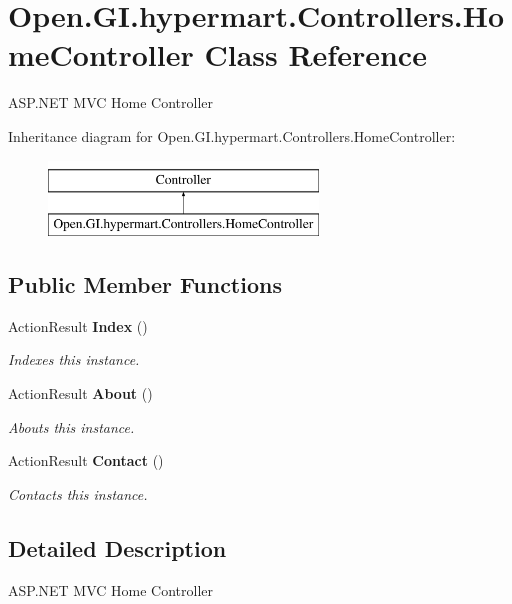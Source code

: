 \section{Open.\+G\+I.\+hypermart.\+Controllers.\+Home\+Controller Class Reference}
\label{class_open_1_1_g_i_1_1hypermart_1_1_controllers_1_1_home_controller}


A\+S\+P.\+N\+ET M\+VC Home Controller  


Inheritance diagram for Open.\+G\+I.\+hypermart.\+Controllers.\+Home\+Controller\+:\begin{figure}[H]
\begin{center}
\leavevmode
\includegraphics[height=2.000000cm]{class_open_1_1_g_i_1_1hypermart_1_1_controllers_1_1_home_controller}
\end{center}
\end{figure}
\subsection*{Public Member Functions}
\begin{DoxyCompactItemize}
\item 
Action\+Result \textbf{ Index} ()
\begin{DoxyCompactList}\small\item\em Indexes this instance. \end{DoxyCompactList}\item 
Action\+Result \textbf{ About} ()
\begin{DoxyCompactList}\small\item\em Abouts this instance. \end{DoxyCompactList}\item 
Action\+Result \textbf{ Contact} ()
\begin{DoxyCompactList}\small\item\em Contacts this instance. \end{DoxyCompactList}\end{DoxyCompactItemize}


\subsection{Detailed Description}
A\+S\+P.\+N\+ET M\+VC Home Controller 

